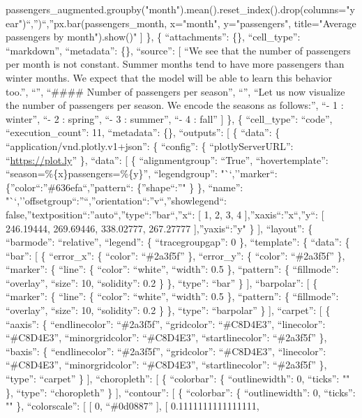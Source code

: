\documentclass[
]{article}
\begin{document}
passengers\_augmented.groupby("month").mean().reset\_index().drop(columns="year")\n``,'')\n``,''px.bar(passengers\_month,
x="month", y="passengers", title="Average passengers by
month").show()\n" {]} \}, \{ ``attachments'': \{\}, ``cell\_type'':
``markdown'', ``metadata'': \{\}, ``source'': {[} ``We see that the
number of passengers per month is not constant. Summer months tend to
have more passengers than winter months. We expect that the model will
be able to learn this behavior too.\n'', ``\n'', ``\#\#\#\# Number of
passengers per season\n'', ``\n'', ``Let us now visualize the number of
passengers per season. We encode the seasons as follows:\n'', ``- 1 :
winter\n'', ``- 2 : spring\n'', ``- 3 : summer\n'', ``- 4 : fall'' {]}
\}, \{ ``cell\_type'': ``code'', ``execution\_count'': 11, ``metadata'':
\{\}, ``outputs'': {[} \{ ``data'': \{
``application/vnd.plotly.v1+json'': \{ ``config'': \{
``plotlyServerURL'': ``\url{https://plot.ly}'' \}, ``data'': {[} \{
``alignmentgroup'': ``True'', ``hovertemplate'':
``season=\%\{x\}passengers=\%\{y\}'', ``legendgroup'': "``,''marker``:
\{''color``:''\#636efa``,''pattern``: \{''shape``:''" \} \}, ``name'':
"``,''offsetgroup``:''``,''orientation``:''v``,''showlegend``:
false,''textposition``:''auto``,''type``:''bar``,''x``: {[} 1, 2, 3, 4
{]},''xaxis``:''x``,''y``: {[} 246.19444, 269.69446, 338.02777,
267.27777 {]},''yaxis``:''y" \} {]}, ``layout'': \{ ``barmode'':
``relative'', ``legend'': \{ ``tracegroupgap'': 0 \}, ``template'': \{
``data'': \{ ``bar'': {[} \{ ``error\_x'': \{ ``color'': ``\#2a3f5f''
\}, ``error\_y'': \{ ``color'': ``\#2a3f5f'' \}, ``marker'': \{
``line'': \{ ``color'': ``white'', ``width'': 0.5 \}, ``pattern'': \{
``fillmode'': ``overlay'', ``size'': 10, ``solidity'': 0.2 \} \},
``type'': ``bar'' \} {]}, ``barpolar'': {[} \{ ``marker'': \{ ``line'':
\{ ``color'': ``white'', ``width'': 0.5 \}, ``pattern'': \{
``fillmode'': ``overlay'', ``size'': 10, ``solidity'': 0.2 \} \},
``type'': ``barpolar'' \} {]}, ``carpet'': {[} \{ ``aaxis'': \{
``endlinecolor'': ``\#2a3f5f'', ``gridcolor'': ``\#C8D4E3'',
``linecolor'': ``\#C8D4E3'', ``minorgridcolor'': ``\#C8D4E3'',
``startlinecolor'': ``\#2a3f5f'' \}, ``baxis'': \{ ``endlinecolor'':
``\#2a3f5f'', ``gridcolor'': ``\#C8D4E3'', ``linecolor'': ``\#C8D4E3'',
``minorgridcolor'': ``\#C8D4E3'', ``startlinecolor'': ``\#2a3f5f'' \},
``type'': ``carpet'' \} {]}, ``choropleth'': {[} \{ ``colorbar'': \{
``outlinewidth'': 0, ``ticks'': "" \}, ``type'': ``choropleth'' \} {]},
``contour'': {[} \{ ``colorbar'': \{ ``outlinewidth'': 0, ``ticks'': ""
\}, ``colorscale'': {[} {[} 0, ``\#0d0887'' {]}, {[} 0.1111111111111111,
\end{document}
